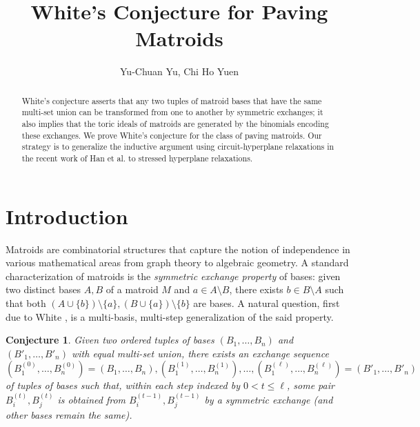 \documentclass{amsart}
\newtheorem{conjecture}[theorem]{Conjecture}
\begin{document}
\title{White's Conjecture for Paving Matroids}
\author{Yu-Chuan Yu, Chi Ho Yuen}
\address{Department of Applied Math., National Yang Ming Chiao Tung University, Taiwan}

\maketitle
\begin{abstract}
White's conjecture asserts that any two tuples of matroid bases that have the same multi-set union can be transformed from one to another by symmetric exchanges; it also implies that the toric ideals of matroids are generated by the binomials encoding these exchanges. We prove White's conjecture for the class of paving matroids. Our strategy is to generalize the inductive argument using circuit-hyperplane relaxations in the recent work of Han et al. to stressed hyperplane relaxations.
\end{abstract}

\section{Introduction}

Matroids are combinatorial structures that capture the notion of independence in various mathematical areas from graph theory to algebraic geometry. A standard characterization of matroids is the {\em symmetric exchange property} of bases: given two distinct bases $A,B$ of a matroid $M$ and $a\in A\setminus B$, there exists $b\in B\setminus A$ such that both $(A\cup\{b\})\setminus\{a\}, (B\cup\{a\})\setminus\{b\}$ are bases. A natural question, first due to White \cite{White1980}, is a multi-basis, multi-step generalization of the said property. 

\begin{conjecture} \label{conj:White}
    Given two ordered tuples of bases $(B_1,\ldots, B_n)$ and $(B'_1,\ldots,B'_n)$ with equal multi-set union, there exists an {\em exchange sequence} $(B_1^{(0)},\ldots,B_n^{(0)})=(B_1,\ldots,B_n), (B_1^{(1)},\ldots,B_n^{(1)}),\ldots,(B_1^{(\ell)},\ldots,B_n^{(\ell)})=(B'_1,\ldots,B'_n)$ of tuples of bases such that, within each step indexed by $0<t\leq\ell$, some pair $B_i^{(t)}, B_j^{(t)}$ is obtained from $B_i^{(t-1)}, B_j^{(t-1)}$ by a symmetric exchange (and other bases remain the same).
\end{conjecture}
\end{document}
